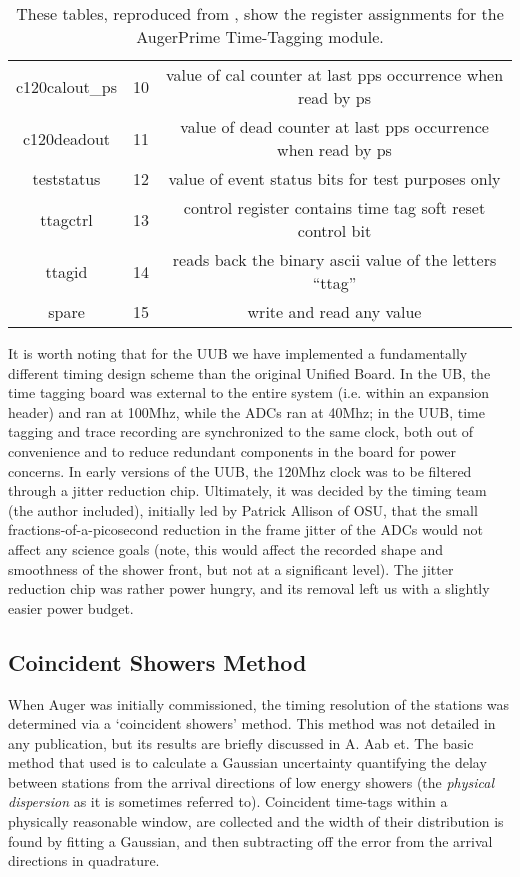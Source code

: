 \begin{table}
\begin{center}
\begin{tiny}
\begin{tabular}{c c c}
c120calout\_ps&10&value of cal counter at last pps occurrence when read by ps \\
c120deadout&11&value of dead counter at last pps occurrence when read by ps \\
teststatus&12&value of event status bits for test purposes only \\
ttagctrl&13&control register contains time tag soft reset control bit \\
ttagid&14&reads back the binary ascii value of the letters ``ttag''\\
spare&15&write and read any value \\
\end{tabular}
\end{tiny}
\end{center}
\caption[Table of Register Assignments]{These tables, reproduced from \textcite{bobttag}, show the register assignments for the AugerPrime Time-Tagging module.}
\label{ttagspec}
\end{table}

It is worth noting that for the UUB we have implemented a fundamentally different timing design scheme than the original Unified Board. In the UB, the time tagging board was external to the entire system (i.e. within an expansion header) and ran at 100Mhz, while the ADCs ran at 40Mhz; in the UUB, time tagging and trace recording are synchronized to the same clock, both out of convenience and to reduce redundant components in the board for power concerns. In early versions of the UUB, the 120Mhz clock was to be filtered through a jitter reduction chip. Ultimately, it was decided by the timing team (the author included), initially led by Patrick Allison of OSU, that the small fractions-of-a-picosecond reduction in the frame jitter of the ADCs would not affect any science goals (note, this would affect the recorded shape and smoothness of the shower front, but not at a significant level). The jitter reduction chip was rather power hungry, and its removal left us with a slightly easier power budget.

\subsection{Coincident Showers Method}
When Auger was initially commissioned, the timing resolution of the stations was determined via a `coincident showers' method. This method was not detailed in any publication, but its results are briefly discussed in A. Aab et\textcite{fddiam}. The basic method that used is to calculate a Gaussian uncertainty quantifying the delay between stations from the arrival directions of low energy showers (the \textit{physical dispersion} as it is sometimes referred to). Coincident time-tags within a physically reasonable window, are collected and the width of their distribution is found by fitting a Gaussian, and then subtracting off the error from the arrival directions in quadrature. 

